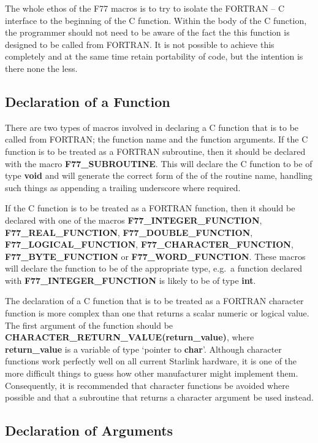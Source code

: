 The whole ethos of the F77 macros is to try to isolate the FORTRAN -- C
interface to the beginning of the C function. Within the body of the C
function, the programmer should not need to be aware of the fact the this
function is designed to be called from FORTRAN. It is not possible to achieve
this completely and at the same time retain portability of code, but the 
intention is there none the less.

\subsection{Declaration of a Function}

There are two types of macros involved in declaring a C function that is to be
called from FORTRAN; the function name and the function arguments. If the C
function is to be treated as a FORTRAN subroutine, then it should be declared
with the macro {\bf F77\_SUBROUTINE}. This will declare the C function to be of
type {\bf void} and will generate the correct form of the of the routine name,
handling such things as appending a trailing underscore where required.

If the C function is to be treated as a FORTRAN function, then it should be
declared with one of the macros {\bf F77\_INTEGER\_FUNCTION}, {\bf
F77\_REAL\_FUNCTION}, {\bf F77\_DOUBLE\_FUNCTION}, {\bf
F77\_LOGICAL\_FUNCTION}, {\bf F77\_CHARACTER\_FUNCTION}, {\bf
F77\_BYTE\_FUNCTION} or {\bf F77\_WORD\_FUNCTION}. These macros will declare
the function to be of the appropriate type, e.g.\ a function declared with {\bf
F77\_INTEGER\_FUNCTION} is likely to be of type {\bf int}.

The declaration of a C function that is to be treated as a FORTRAN character
function is more complex than one that returns a scalar numeric or logical
value. The first argument of the function should be {\bf
CHARACTER\_RETURN\_VALUE(return\_value)}, where {\bf return\_value} is a
variable of type `pointer to {\bf char}'. Although character functions work
perfectly well on all current Starlink hardware, it is one of the more
difficult things to guess how other manufacturer might implement them.
Consequently, it is recommended that character functions be avoided where
possible and that a subroutine that returns a character argument be used
instead.

\subsection{Declaration of Arguments}

